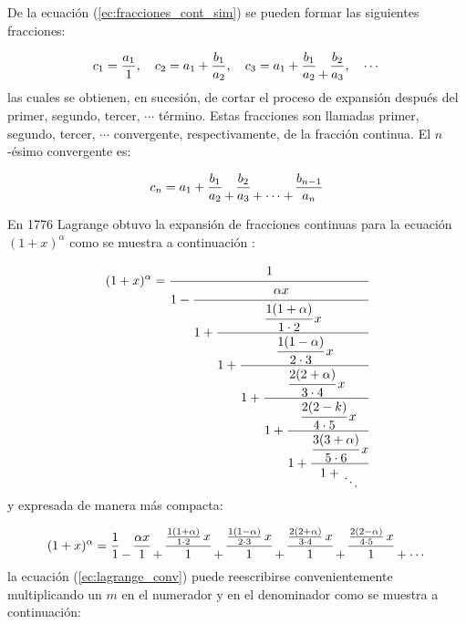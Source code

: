 	De la ecuación (\ref{ec:fracciones_cont_sim}) se pueden formar las siguientes fracciones:

	\begin{equation}
		c_{1} = \frac{a_{1}}{1} , \quad c_{2} = a_{1} + \frac{b_{1}}{a_{2}}, \quad c_{3} = a_{1} + \frac{b_{1}}{a_{2}} \genfrac{}{}{0pt}{0}{}{+} \frac{b_{2}}{a_{3}}, \quad \cdots
	\end{equation}
	las cuales se obtienen, en sucesión, de cortar el proceso de expansión después del primer, segundo, tercer, $\cdots$ término. Estas fracciones son llamadas primer, segundo, tercer, $\cdots$  convergente, respectivamente, de la fracción continua. El $n$-ésimo convergente es:

	\begin{equation}
		c_{n} = a_{1} + \frac{b_{1}}{a_{2}} \genfrac{}{}{0pt}{0}{}{+} \frac{b_{2}}{a_{3}} \genfrac{}{}{0pt}{0}{}{+} \genfrac{}{}{0pt}{0}{}{\cdots} \genfrac{}{}{0pt}{0}{}{+} \frac{b_{n-1}}{a_{n}}
	\end{equation}

	En 1776 Lagrange obtuvo la expansión de fracciones continuas para la ecuación $(1 + x)^{\alpha}$ como se muestra a continuación \cite{Olds2009}:

	\begin{equation}
 		(1 + x)^{\alpha} = \cfrac{1}{1 - \cfrac{\alpha x}{1 + \cfrac{\cfrac{1(1 + \alpha)}{1\cdot2}\,x}{1 + \cfrac{\cfrac{1(1 - \alpha)}{2\cdot3}\,x}{1 + \cfrac{\cfrac{2(2 + \alpha)}{3\cdot4}\,x}{1 + \cfrac{\cfrac{2(2 - k)}{4\cdot5}\,x}{1 + \cfrac{\cfrac{3(3 + \alpha)}{5\cdot6}\,x}{1 + \genfrac{}{}{0pt}{0}{}{\ddots}}}}}}}}
		 \label{ec:lagrange}
	\end{equation}
	y expresada de manera más compacta:

	\begin{equation}
 		(1 + x)^{\alpha} = \frac{1}{1} \genfrac{}{}{0pt}{0}{}{-} \frac{\alpha x}{1} \genfrac{}{}{0pt}{0}{}{+} \frac{\frac{1(1 + \alpha)}{1\cdot2}\,x}{1} \genfrac{}{}{0pt}{0}{}{+} \frac{\frac{1(1 - \alpha)}{2\cdot3}\,x}{1} \genfrac{}{}{0pt}{0}{}{+} \frac{\frac{2(2 + \alpha)}{3\cdot4}\,x}{1} \genfrac{}{}{0pt}{0}{}{+} \frac{\frac{2(2 - \alpha)}{4\cdot5}\,x}{1} \genfrac{}{}{0pt}{0}{}{+} \genfrac{}{}{0pt}{0}{}{\cdots} 
		\label{ec:lagrange_conv}
	\end{equation}
	la ecuación (\ref{ec:lagrange_conv}) puede reescribirse convenientemente multiplicando un $m$ en el numerador y en el denominador como se muestra a continuación:

